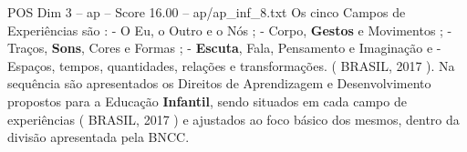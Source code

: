 \begin{textsample}{POS Dim 3 – ap – Score 16.00 – ap/ap\_inf\_8.txt}
Os cinco Campos de Experiências são : - O Eu, o Outro e o Nós ; - Corpo, \textbf{Gestos} e Movimentos ; - Traços, \textbf{Sons}, Cores e Formas ; - \textbf{Escuta}, Fala, Pensamento e Imaginação e - Espaços, tempos, quantidades, relações e transformações. ( BRASIL, 2017 ).
Na sequência são apresentados os Direitos de Aprendizagem e Desenvolvimento propostos para a Educação \textbf{Infantil}, sendo situados em cada campo de experiências ( BRASIL, 2017 ) e ajustados ao foco básico dos mesmos, dentro da divisão apresentada pela BNCC.

\end{textsample}
